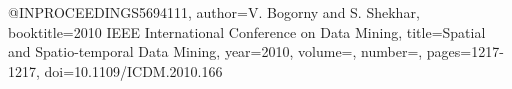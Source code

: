 @INPROCEEDINGS{5694111,
  author={V. {Bogorny} and S. {Shekhar}},
  booktitle={2010 IEEE International Conference on Data Mining}, 
  title={Spatial and Spatio-temporal Data Mining}, 
  year={2010},
  volume={},
  number={},
  pages={1217-1217},
  doi={10.1109/ICDM.2010.166}}